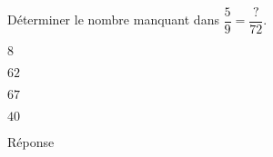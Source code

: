 \begin{exercice}
    Déterminer le nombre manquant dans $\dfrac{5}{9}=\dfrac{\text{?}}{72}$.
    \begin{ChoixQCM}{4}
        \item $8$
        \item $62$
        \item $67$
        \item $40$
    \end{ChoixQCM}
\end{exercice}
\begin{corrige}
    Réponse 
\end{corrige}